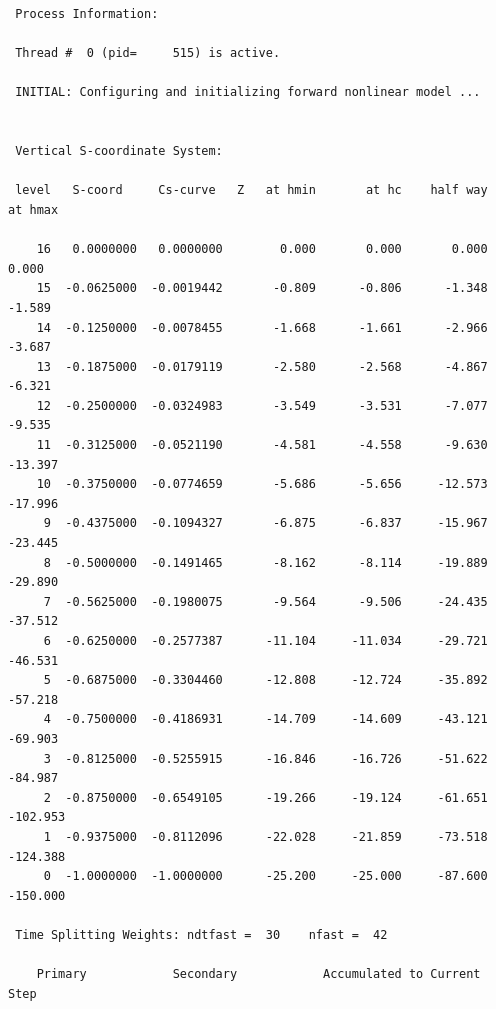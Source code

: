 \begin{verbatim}
 Process Information:

 Thread #  0 (pid=     515) is active.

 INITIAL: Configuring and initializing forward nonlinear model ...


 Vertical S-coordinate System: 

 level   S-coord     Cs-curve   Z   at hmin       at hc    half way    at hmax

    16   0.0000000   0.0000000        0.000       0.000       0.000      0.000
    15  -0.0625000  -0.0019442       -0.809      -0.806      -1.348     -1.589
    14  -0.1250000  -0.0078455       -1.668      -1.661      -2.966     -3.687
    13  -0.1875000  -0.0179119       -2.580      -2.568      -4.867     -6.321
    12  -0.2500000  -0.0324983       -3.549      -3.531      -7.077     -9.535
    11  -0.3125000  -0.0521190       -4.581      -4.558      -9.630    -13.397
    10  -0.3750000  -0.0774659       -5.686      -5.656     -12.573    -17.996
     9  -0.4375000  -0.1094327       -6.875      -6.837     -15.967    -23.445
     8  -0.5000000  -0.1491465       -8.162      -8.114     -19.889    -29.890
     7  -0.5625000  -0.1980075       -9.564      -9.506     -24.435    -37.512
     6  -0.6250000  -0.2577387      -11.104     -11.034     -29.721    -46.531
     5  -0.6875000  -0.3304460      -12.808     -12.724     -35.892    -57.218
     4  -0.7500000  -0.4186931      -14.709     -14.609     -43.121    -69.903
     3  -0.8125000  -0.5255915      -16.846     -16.726     -51.622    -84.987
     2  -0.8750000  -0.6549105      -19.266     -19.124     -61.651   -102.953
     1  -0.9375000  -0.8112096      -22.028     -21.859     -73.518   -124.388
     0  -1.0000000  -1.0000000      -25.200     -25.000     -87.600   -150.000

 Time Splitting Weights: ndtfast =  30    nfast =  42

    Primary            Secondary            Accumulated to Current Step


\end{verbatim}
